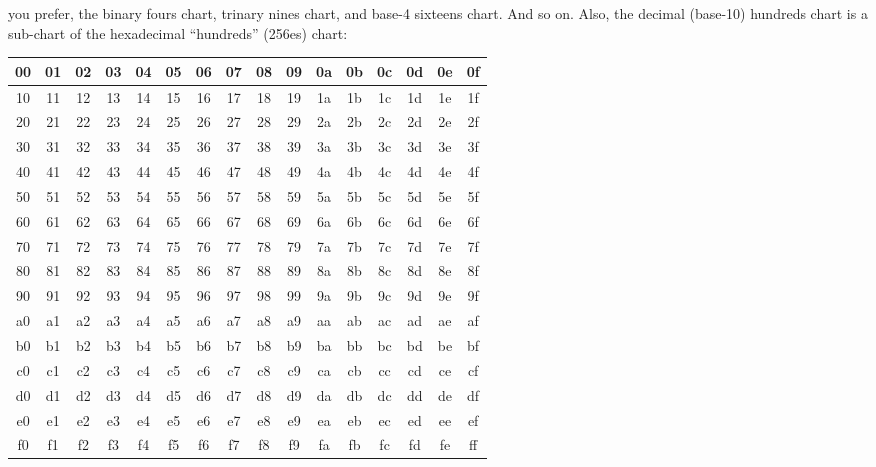 \documentclass[12pt]{article}
\newcommand{\tablesize}{\footnotesize\sffamily}
\begin{document}
you prefer, the binary fours chart, trinary nines chart, and base-4
sixteens chart.  And so on.  Also, the decimal (base-10) hundreds
chart is a sub-chart of the hexadecimal ``hundreds'' (256es) chart:
\begin{center}\tablesize
\begin{tabular}{|c|c|c|c|c|c|c|c|c|c|c|c|c|c|c|c|}
\hline
 00 & 01 & 02 & 03 & 04 & 05 & 06 & 07 & 08 & 09 & 0a & 0b & 0c & 0d & 0e & 0f \\ \hline
 10 & 11 & 12 & 13 & 14 & 15 & 16 & 17 & 18 & 19 & 1a & 1b & 1c & 1d & 1e & 1f \\ \hline
 20 & 21 & 22 & 23 & 24 & 25 & 26 & 27 & 28 & 29 & 2a & 2b & 2c & 2d & 2e & 2f \\ \hline
 30 & 31 & 32 & 33 & 34 & 35 & 36 & 37 & 38 & 39 & 3a & 3b & 3c & 3d & 3e & 3f \\ \hline
 40 & 41 & 42 & 43 & 44 & 45 & 46 & 47 & 48 & 49 & 4a & 4b & 4c & 4d & 4e & 4f \\ \hline
 50 & 51 & 52 & 53 & 54 & 55 & 56 & 57 & 58 & 59 & 5a & 5b & 5c & 5d & 5e & 5f \\ \hline
 60 & 61 & 62 & 63 & 64 & 65 & 66 & 67 & 68 & 69 & 6a & 6b & 6c & 6d & 6e & 6f \\ \hline
 70 & 71 & 72 & 73 & 74 & 75 & 76 & 77 & 78 & 79 & 7a & 7b & 7c & 7d & 7e & 7f \\ \hline
 80 & 81 & 82 & 83 & 84 & 85 & 86 & 87 & 88 & 89 & 8a & 8b & 8c & 8d & 8e & 8f \\ \hline
 90 & 91 & 92 & 93 & 94 & 95 & 96 & 97 & 98 & 99 & 9a & 9b & 9c & 9d & 9e & 9f \\ \hline
 a0 & a1 & a2 & a3 & a4 & a5 & a6 & a7 & a8 & a9 & aa & ab & ac & ad & ae & af \\ \hline
 b0 & b1 & b2 & b3 & b4 & b5 & b6 & b7 & b8 & b9 & ba & bb & bc & bd & be & bf \\ \hline
 c0 & c1 & c2 & c3 & c4 & c5 & c6 & c7 & c8 & c9 & ca & cb & cc & cd & ce & cf \\ \hline
 d0 & d1 & d2 & d3 & d4 & d5 & d6 & d7 & d8 & d9 & da & db & dc & dd & de & df \\ \hline
 e0 & e1 & e2 & e3 & e4 & e5 & e6 & e7 & e8 & e9 & ea & eb & ec & ed & ee & ef \\ \hline
 f0 & f1 & f2 & f3 & f4 & f5 & f6 & f7 & f8 & f9 & fa & fb & fc & fd & fe & ff \\ \hline
\end{tabular}
\end{center}
\end{document}
